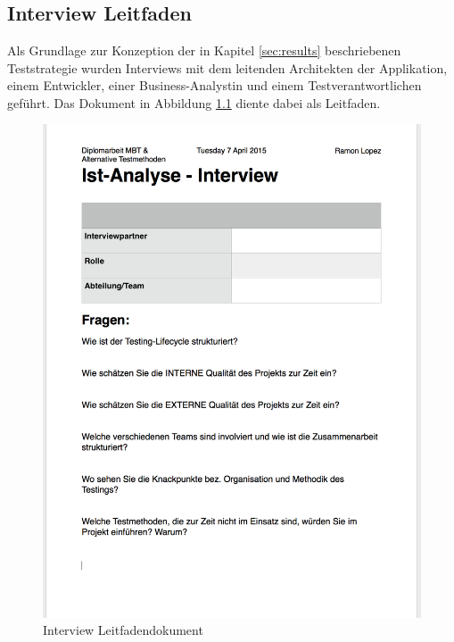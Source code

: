 \chapter{\appendixlabel}
\section{Interview Leitfaden}
\label{app:leitfaden}
Als Grundlage zur Konzeption der in Kapitel \ref{sec:results} beschriebenen Teststrategie wurden Interviews mit dem leitenden Architekten der Applikation, einem Entwickler, einer Business-Analystin und einem Testverantwortlichen geführt. Das Dokument in Abbildung \ref{fig:leitfaden} diente dabei als Leitfaden.

\begin{figure}[h] 
  \centering
     \includegraphics[width=1.0\textwidth]{figures/leitfaden.png}
  \caption{Interview Leitfadendokument}
  \label{fig:leitfaden}
\end{figure}

